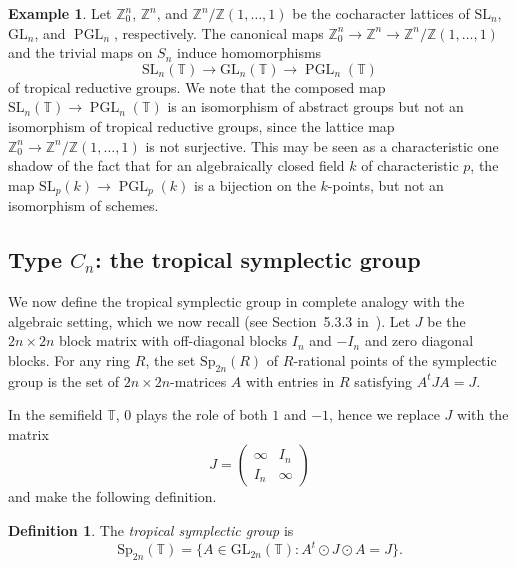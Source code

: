 \documentclass[10pt, a4paper]{amsart}
\theoremstyle{definition}
\newtheorem{definition}[theorem]{Definition}
\newtheorem{example}[theorem]{Example}
\theoremstyle{myitemstyle}
\newcommand{\ZZ}{\mathbb{Z}}
\newcommand{\TT}{\mathbb{T}}
\DeclareMathOperator{\PGL}{PGL}
\newcommand{\SL}{{\mathrm{SL}}}
\newcommand{\GL}{{\mathrm{GL}}}
\newcommand{\Sp}{{\mathrm{Sp}}}
\begin{document}
\begin{example} Let $\ZZ^n_{0}$, $\ZZ^n$, and $\ZZ^n/\ZZ(1,\ldots,1)$ be the cocharacter lattices of $\SL_n$, $\GL_n$, and $\PGL_n$, respectively. The canonical maps $\ZZ^n_{0}\to\ZZ^n\to\ZZ^n/\ZZ(1,\ldots,1)$ and the trivial maps on $S_n$ induce homomorphisms
\[
\SL_n(\TT)\to \GL_n(\TT)\to \PGL_n(\TT)
\]
of tropical reductive groups. We note that the composed map $\SL_n(\TT)\to \PGL_n(\TT)$ is an isomorphism of abstract groups but not an isomorphism of tropical reductive groups, since the lattice map $\ZZ^n_{0}\to\ZZ^n/\ZZ(1,\ldots,1)$ is not surjective. This may be seen as a characteristic one shadow of the fact that for an algebraically closed field $k$ of characteristic $p$, the map $\SL_p(k)\to \PGL_p(k)$ is a bijection on the $k$-points, but not an isomorphism of schemes.
\end{example}




















\subsection{Type $C_n$: the tropical symplectic group} We now define the tropical symplectic group in complete analogy with the algebraic setting, which we now recall (see Section~5.3.3 in~\cite{Lorscheid_blueprintsII}). Let $J$ be the $2n\times 2n$ block matrix with off-diagonal blocks $I_n$ and $-I_n$ and zero diagonal blocks. For any ring $R$, the set $\Sp_{2n}(R)$ of $R$-rational points of the symplectic group is the set of $2n\times 2n$-matrices $A$ with entries in $R$ satisfying $A^tJA=J$.

In the semifield $\TT$, $0$ plays the role of both $1$ and $-1$, hence we replace $J$ with the matrix 
\[
J=\left(\begin{array}{cc}
    \infty & I_n \\
     I_n & \infty
\end{array}\right)
\]
and make the following definition.

\begin{definition} The \emph{tropical symplectic group} is
\[
\Sp_{2n}(\TT) = \{A \in \GL_{2n}(\TT):  A^t \odot J \odot A=J  \}.
\]
    
\end{definition}
\end{document}
